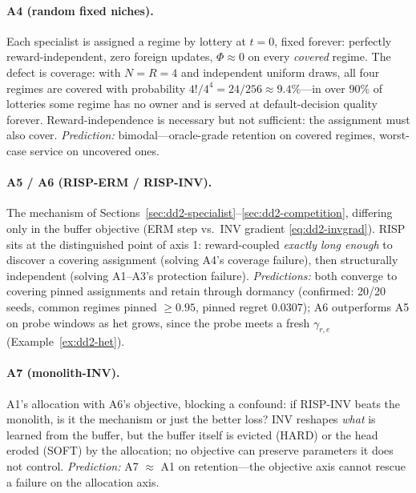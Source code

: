 \documentclass[11pt,a4paper]{article}
\theoremstyle{definition}
\theoremstyle{plain}
\newcommand{\nm}{\textsc{RISP}}
\begin{document}
\paragraph{A4 (random fixed niches).} Each specialist is assigned a regime
by lottery at $t = 0$, fixed forever: perfectly reward-independent, zero
foreign updates, $\Phi \approx 0$ on every \emph{covered} regime. The defect
is coverage: with $N = R = 4$ and independent uniform draws, all four
regimes are covered with probability $4!/4^4 = 24/256 \approx 9.4\%$---in
over $90\%$ of lotteries some regime has no owner and is served at
default-decision quality forever. Reward-independence is necessary but not
sufficient: the assignment must also cover.
\emph{Prediction:} bimodal---oracle-grade retention on covered regimes,
worst-case service on uncovered ones.

\paragraph{A5 / A6 (\nm{}-ERM / \nm{}-INV).} The mechanism of
Sections~\ref{sec:dd2-specialist}--\ref{sec:dd2-competition}, differing only
in the buffer objective (ERM step vs.\ INV gradient \eqref{eq:dd2-invgrad}).
\nm{} sits at the distinguished point of axis 1: reward-coupled
\emph{exactly long enough} to discover a covering assignment (solving A4's
coverage failure), then structurally independent (solving A1--A3's
protection failure). \emph{Predictions:} both converge to covering pinned
assignments and retain through dormancy (confirmed: 20/20 seeds, common
regimes pinned $\ge 0.95$, pinned regret $0.0307$); A6 outperforms A5 on
probe windows as $\mathrm{het}$ grows, since the probe meets a fresh
$\gamma_{r,e}$ (Example~\ref{ex:dd2-het}).

\paragraph{A7 (monolith-INV).} A1's allocation with A6's objective, blocking
a confound: if \nm{}-INV beats the monolith, is it the mechanism or just the
better loss? INV reshapes \emph{what} is learned from the buffer, but the
buffer itself is evicted (HARD) or the head eroded (SOFT) by the allocation;
no objective can preserve parameters it does not control.
\emph{Prediction:} A7 $\approx$ A1 on retention---the objective axis cannot
rescue a failure on the allocation axis.
\end{document}
